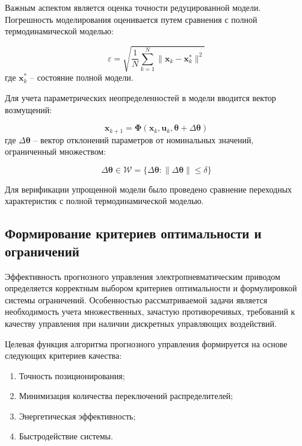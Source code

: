 Важным аспектом является оценка точности редуцированной модели. Погрешность
моделирования оценивается путем сравнения с полной термодинамической моделью:

\begin{equation}
	\varepsilon = \sqrt{\frac{1}{N}\sum_{k=1}^N\|\mathbf{x}_k - \mathbf{x}_k^*\|^2}
\end{equation}
где $\mathbf{x}_k^*$ -- состояние полной модели.

Для учета параметрических неопределенностей в модели вводится вектор возмущений:

\begin{equation}
	\mathbf{x}_{k+1} = \boldsymbol{\Phi}(\mathbf{x}_k, \mathbf{u}_k, \boldsymbol{\theta} + \Delta\boldsymbol{\theta})
\end{equation}
где $\Delta\boldsymbol{\theta}$ -- вектор отклонений параметров от номинальных значений, ограниченный множеством:

\begin{equation}
	\Delta\boldsymbol{\theta} \in \mathcal{W} = \{\Delta\boldsymbol{\theta}: \|\Delta\boldsymbol{\theta}\| \leq \delta\}
\end{equation}

Для верификации упрощенной модели было проведено сравнение переходных характеристик с полной термодинамической моделью.

\subsection{Формирование критериев оптимальности и ограничений}\label{subsec:ch3/sec5/sub3}

Эффективность прогнозного управления электропневматическим приводом определяется корректным выбором
критериев оптимальности и формулировкой системы ограничений. Особенностью рассматриваемой задачи является
необходимость учета множественных, зачастую противоречивых,
требований к качеству управления при наличии дискретных управляющих воздействий.

Целевая функция алгоритма прогнозного управления формируется на основе следующих критериев качества:

\begin{enumerate}
	\item Точность позиционирования;
	\item Минимизация количества переключений распределителей;
	\item Энергетическая эффективность;
	\item Быстродействие системы.
\end{enumerate}


